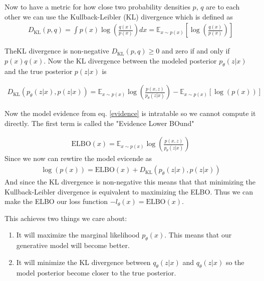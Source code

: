 Now to have a metric for how close two probability densities $p$, $q$ are to each other we can use the Kullback-Leibler (KL) divergence which is defined as
\begin{align}
D_{\text{KL}}(p,q) = \int p(x)\log \left(\frac{q(x)}{p(x)}\right) dx =  \mathbb{E}_{x\sim p(x)}\left[ \log\left(\frac{q(x)}{p(x)}\right)\right]
\end{align}

TheKL divergence  is non-negative $D_{\text{KL}}(p,q) \geq 0$ and zero if and only if $p(x) q(x)$. Now the KL divergence  between the modeled posterior $ p_\theta(z|x)$ and the true posterior  $p(z|x)$ is

\begin{align}
    D_{\text{KL}}(p_\theta(z|x),p(z|x)) = \mathbb{E}_{x\sim p(x)} \log\left(\frac{p(x,z)}{p_\theta(z|x)}\right) -  \mathbb{E}_{x\sim p(x)} \left[\log(p(x))\right]
\end{align}

Now the model evidence from eq. \ref{evidence} is intratable so we cannot compute it directly. The first term is called the "Evidence Lower BOund" 

\begin{align}
    \text{ELBO}(x) = \mathbb{E}_{x\sim p(x)} \log\left(\frac{p(x,z)}{p_\theta(z|x)}\right)
\end{align}
Since we now can rewtire the model evicende as 
\begin{align}
    \log(p(x)) = \text{ELBO}(x) +  D_{\text{KL}}(p_\theta(z|x),p(z|x))
\end{align}
And since the KL divergence is non-negative this means that that minimizing the Kullback-Leibler divergence is equivalent to maximizing the ELBO. Thus we can make the ELBO our loss function $-l_\theta(x)=\text{ELBO}(x)$. 

This achieves two things we care about\cite{vaeintro}: 

\begin{enumerate}
    \item It will maximize the marginal likelihood $p_\theta(x)$.
This means that our generative model will become better.
    \item It will minimize the KL divergence between $q_\theta(z|x)$ and $q_\theta(z|x)$ so the model posterior become closer to the true posterior.
\end{enumerate}




